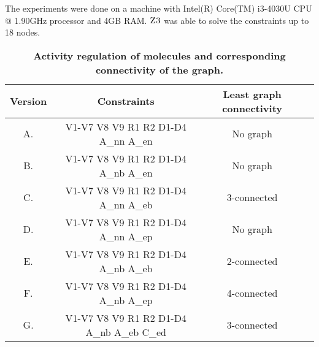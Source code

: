 The experiments were done on a machine with Intel(R) Core(TM) i3-4030U CPU @ 1.90GHz processor 
and 4GB RAM.
%
$\textsc{Z3}$ was able to solve the constraints up to 18 nodes.
%


\begin{table}[!ht]
\centering
\def\arraystretch{1.6}
\caption{
{\bf Activity regulation of molecules and corresponding connectivity of the graph.}}
  \begin{tabular}{|c|c|c|c|}
    \hline
  {\textbf{Version}}  & {\textbf{Constraints}} &  {\textbf{Least graph connectivity}}  \\
    \hline
    
    A. & V1-V7 V8 V9 R1 R2 D1-D4 A\_nn A\_en & No graph  \\ \hline
B. & V1-V7 V8 V9 R1 R2 D1-D4 A\_nb A\_en & No graph  \\ \hline
C. & V1-V7 V8 V9 R1 R2 D1-D4 A\_nn A\_eb & 3-connected  \\  \hline
D. & V1-V7 V8 V9 R1 R2 D1-D4 A\_nn A\_ep & No graph  \\ \hline
E. & V1-V7 V8 V9 R1 R2 D1-D4 A\_nb A\_eb & 2-connected  \\ \hline
F. & V1-V7 V8 V9 R1 R2 D1-D4 A\_nb A\_ep & 4-connected  \\ \hline
G. & V1-V7 V8 V9 R1 R2 D1-D4 A\_nb A\_eb C\_ed & 3-connected \\ \hline


  \end{tabular}
\label{table1}
\end{table}



